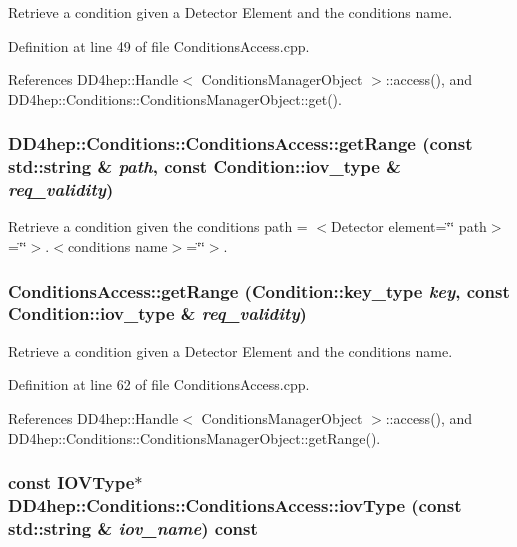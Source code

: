 Retrieve a condition given a Detector Element and the conditions name. 

Definition at line 49 of file ConditionsAccess.cpp.

References DD4hep::Handle$<$ ConditionsManagerObject $>$::access(), and DD4hep::Conditions::ConditionsManagerObject::get().\hypertarget{class_d_d4hep_1_1_conditions_1_1_conditions_access_a44bbed9e32bd8ffe16319a83556571dd}{
\subsubsection[{getRange}]{ DD4hep::Conditions::ConditionsAccess::getRange (const std::string \& {\em path}, \/  const {\bf Condition::iov\_\-type} \& {\em req\_\-validity})}}
\label{class_d_d4hep_1_1_conditions_1_1_conditions_access_a44bbed9e32bd8ffe16319a83556571dd}


Retrieve a condition given the conditions path = $<$Detector element=\char`\"{}\char`\"{} path$>$=\char`\"{}\char`\"{}$>$.$<$conditions name$>$=\char`\"{}\char`\"{}$>$. \hypertarget{class_d_d4hep_1_1_conditions_1_1_conditions_access_aa5f5712c3083cec42a3cd49d86924611}{
\subsubsection[{getRange}]{ ConditionsAccess::getRange ({\bf Condition::key\_\-type} {\em key}, \/  const {\bf Condition::iov\_\-type} \& {\em req\_\-validity})}}
\label{class_d_d4hep_1_1_conditions_1_1_conditions_access_aa5f5712c3083cec42a3cd49d86924611}


Retrieve a condition given a Detector Element and the conditions name. 

Definition at line 62 of file ConditionsAccess.cpp.

References DD4hep::Handle$<$ ConditionsManagerObject $>$::access(), and DD4hep::Conditions::ConditionsManagerObject::getRange().\hypertarget{class_d_d4hep_1_1_conditions_1_1_conditions_access_a4e069c9326b34448e7c78480ee9f8ecc}{
\subsubsection[{iovType}]{\setlength{\rightskip}{0pt plus 5cm}const {\bf IOVType}$\ast$ DD4hep::Conditions::ConditionsAccess::iovType (const std::string \& {\em iov\_\-name}) const}}
\label{class_d_d4hep_1_1_conditions_1_1_conditions_access_a4e069c9326b34448e7c78480ee9f8ecc}


